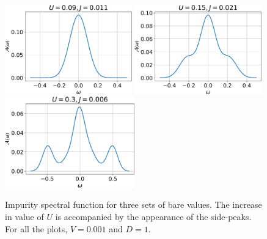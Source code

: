 \documentclass[twoside]{report}
\numberwithin{equation}{section}
\begin{document}
\begin{figure}[htpb]
	\centering
	\includegraphics[width=0.49\textwidth]{../figures/spec_func_1.pdf}
	\includegraphics[width=0.49\textwidth]{../figures/spec_func_2.pdf}
	\includegraphics[width=0.5\textwidth]{../figures/spec_func_3.pdf}
	\caption{Impurity spectral function for three sets of bare values. The increase in value of \(U\) is accompanied by the appearance of the side-peaks. For all the plots, \(V=0.001\) and \(D=1\).}
	\label{spec_func}
\end{figure}
\end{document}
